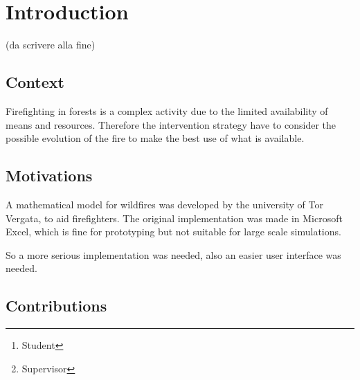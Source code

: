 \documentclass[draft]{article}
\title{\mytitle}
\date{2021}
\author{Diego Bellani\thanks{Student}\and Enrico Tronci\thanks{Supervisor}}
\begin{document}
\begin{titlepage}
	\maketitle

	\begin{abstract}
	(Max one page, da scrivere alla fine)
	\end{abstract}

	\tableofcontents
	\iffalse
	\listoffigures
	\listoftables
	\fi
\end{titlepage}


\section{Introduction}\label{sec:intro}

(da scrivere alla fine)

\subsection{Context}\label{sec:context}

Firefighting in forests is a complex activity due to the limited availability of
means and resources. Therefore the intervention strategy have to consider the
possible evolution of the fire to make the best use of what is available.

\subsection{Motivations}\label{sec:motivations}

A mathematical model for wildfires was developed by the university of Tor
Vergata, to aid firefighters. The original implementation was made in Microsoft
Excel\textsuperscript{\textregistered}, which is fine for prototyping but not
suitable for large scale simulations.

So a more serious implementation was needed, also an easier user interface was
needed.

\iffalse
Describe what is missing and instead would be useful to have\dots Non ne ho la
minima idea. Also Modelica did not made the cut.
\fi

\subsection{Contributions}\label{sec:contrib}
\end{document}

